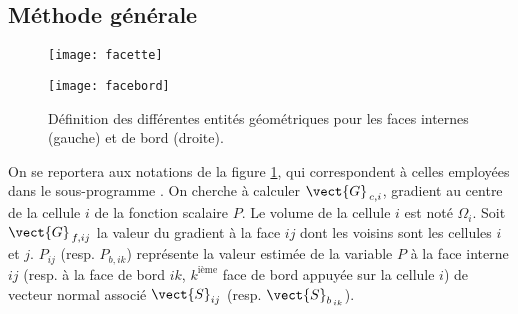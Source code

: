 \subsection*{\bf M\'ethode g\'en\'erale}
\begin{figure}[h]
\parbox{8cm}{%
\centerline{\texttt{[image: facette]}}}
\parbox{8cm}{%
\centerline{\texttt{[image: facebord]}}}
\caption{\label{Base_Gradrc_fig_geom_gradmc}D\'efinition des diff\'erentes entit\'es
g\'eom\'etriques pour les faces internes (gauche) et de bord (droite).}
\end{figure}

On se reportera aux notations de la figure \ref{Base_Gradrc_fig_geom_gradmc}, qui
correspondent \`a celles employ\'ees dans le sous-programme .
On cherche \`a calculer $\vect{G}_{\,c,i}$, gradient au centre de la cellule $i$ de la
fonction scalaire $P$. Le volume de la cellule $i$ est not\'e $\Omega_i$.
 Soit $\vect{G}_{\,f,ij}$ la valeur  du gradient \`a la face $ij$ dont les voisins sont les cellules $i$ et $j$.
$P_{ij}$ (resp. $P_{b,ik}$) repr\'esente la valeur estim\'ee de la variable $P$
\`a la face interne $ij$ (resp. \`a la face de bord $ik$, $k^{\text{i\`eme}}$
face de bord appuy\'ee sur la cellule $i$) de vecteur normal associ\'e
$\vect{S}_{ij}$ (resp. $\vect{S}_{b_{\,ik}}$).

